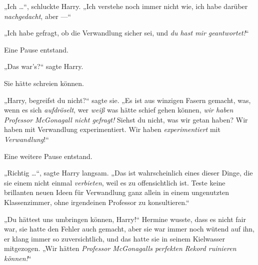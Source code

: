 „Ich …“, schluckte Harry.
„Ich verstehe noch immer nicht wie, ich habe darüber \emph{nachgedacht}, aber —“

„Ich habe gefragt, ob die Verwandlung sicher sei, und \emph{du hast mir geantwortet!}“

Eine Pause entstand.

„Das war’s?“ sagte Harry.

Sie hätte schreien können.

„Harry, begreifst du nicht?“ sagte sie.
„Es ist aus winzigen Fasern gemacht, was, wenn es sich \emph{aufdröselt}, wer \emph{weiß} was hätte schief gehen können, \emph{wir haben Professor McGonagall nicht gefragt!} Siehst du nicht, was wir getan haben? Wir haben mit Verwandlung experimentiert. Wir haben \emph{experimentiert} mit \emph{Verwandlung}!“

Eine weitere Pause entstand.

„Richtig …“, sagte Harry langsam.
„Das ist wahrscheinlich eines dieser Dinge, die sie einem nicht einmal \emph{verbieten}, weil es zu offensichtlich ist. Teste keine brillanten neuen Ideen für Verwandlung ganz allein in einem ungenutzten Klassenzimmer, ohne irgendeinen Professor zu konsultieren.“

„Du hättest uns umbringen können, Harry!“ Hermine wusste, dass es nicht fair war, sie hatte den Fehler auch gemacht, aber sie war immer noch wütend auf ihn, er klang immer so zuversichtlich, und das hatte sie in seinem Kielwasser mitgezogen.
„Wir hätten \emph{Professor McGonagalls perfekten Rekord ruinieren können!}“

